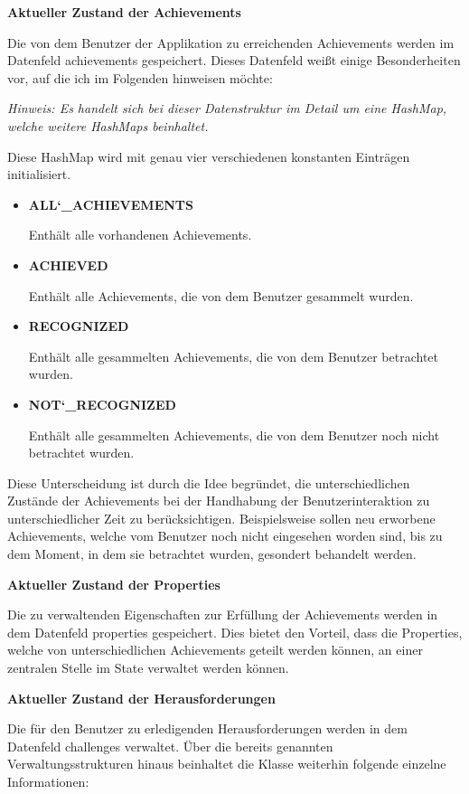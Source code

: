 \documentclass[bibliography=totoc,listof=totoc,BCOR=5mm,DIV=12,oneside]{scrbook}
\begin{document}
\par \bigskip \textbf{Aktueller Zustand der Achievements}
\par Die von dem Benutzer der Applikation zu erreichenden Achievements werden im Datenfeld achievements gespeichert. Dieses Datenfeld weißt einige Besonderheiten vor, auf die ich im Folgenden hinweisen möchte:
\par \medskip  \textit{Hinweis: Es handelt sich bei dieser Datenstruktur im Detail um eine HashMap, welche weitere HashMaps beinhaltet.}
\par \medskip Diese HashMap wird mit genau vier verschiedenen konstanten Einträgen initialisiert.
\begin{itemize}
\item \textbf{ALL\char`_ACHIEVEMENTS}
\par Enthält alle vorhandenen Achievements.
\item \textbf{ACHIEVED}
\par Enthält alle Achievements, die von dem Benutzer gesammelt wurden.
\item \textbf{RECOGNIZED}
\par Enthält alle gesammelten Achievements, die von dem Benutzer betrachtet wurden.
\item \textbf{NOT\char`_RECOGNIZED}
\par Enthält alle gesammelten Achievements, die von dem Benutzer noch nicht betrachtet wurden.
\end{itemize}

\par Diese Unterscheidung ist durch die Idee begründet, die unterschiedlichen Zustände der Achievements bei der Handhabung der Benutzerinteraktion zu unterschiedlicher Zeit zu berücksichtigen. Beispielsweise sollen neu erworbene Achievements, welche vom Benutzer noch nicht eingesehen worden sind, bis zu dem Moment, in dem sie betrachtet wurden, gesondert behandelt werden.

\par \bigskip \textbf{Aktueller Zustand der Properties}
\par Die zu verwaltenden Eigenschaften zur Erfüllung der Achievements werden in dem Datenfeld properties gespeichert. Dies bietet den Vorteil, dass die Properties, welche von unterschiedlichen Achievements geteilt werden können, an einer zentralen Stelle im State verwaltet werden können.

\par \bigskip \textbf{Aktueller Zustand der Herausforderungen}
\par Die für den Benutzer zu erledigenden Herausforderungen werden in dem Datenfeld challenges verwaltet.
Über die bereits genannten Verwaltungsstrukturen hinaus beinhaltet die Klasse weiterhin folgende einzelne Informationen:
\end{document}
